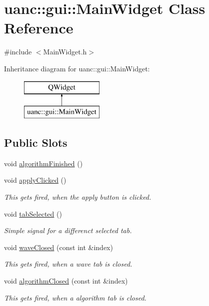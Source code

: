 \hypertarget{classuanc_1_1gui_1_1_main_widget}{}\section{uanc\+:\+:gui\+:\+:Main\+Widget Class Reference}
\label{classuanc_1_1gui_1_1_main_widget}


{\ttfamily \#include $<$Main\+Widget.\+h$>$}

Inheritance diagram for uanc\+:\+:gui\+:\+:Main\+Widget\+:\begin{figure}[H]
\begin{center}
\leavevmode
\includegraphics[height=2.000000cm]{classuanc_1_1gui_1_1_main_widget}
\end{center}
\end{figure}
\subsection*{Public Slots}
\begin{DoxyCompactItemize}
\item 
void \hyperlink{classuanc_1_1gui_1_1_main_widget_ac2e8a417bf4e8b90b707168a9dc65642}{algorithm\+Finished} ()
\item 
void \hyperlink{classuanc_1_1gui_1_1_main_widget_a2c4e4db69935d33facd4280e7dd66b05}{apply\+Clicked} ()
\begin{DoxyCompactList}\small\item\em This gets fired, when the apply button is clicked. \end{DoxyCompactList}\item 
void \hyperlink{classuanc_1_1gui_1_1_main_widget_a3e724b26e32f136b0e8f443075ec05e1}{tab\+Selected} ()
\begin{DoxyCompactList}\small\item\em Simple signal for a differenct selected tab. \end{DoxyCompactList}\item 
void \hyperlink{classuanc_1_1gui_1_1_main_widget_a210dbd2254febbd5e356e0b0a955f052}{wave\+Closed} (const int \&index)
\begin{DoxyCompactList}\small\item\em This gets fired, when a wave tab is closed. \end{DoxyCompactList}\item 
void \hyperlink{classuanc_1_1gui_1_1_main_widget_a01f7a68c0a5fb934183710176625cac4}{algorithm\+Closed} (const int \&index)
\begin{DoxyCompactList}\small\item\em This gets fired, when a algorithm tab is closed. \end{DoxyCompactList}\end{DoxyCompactItemize}
